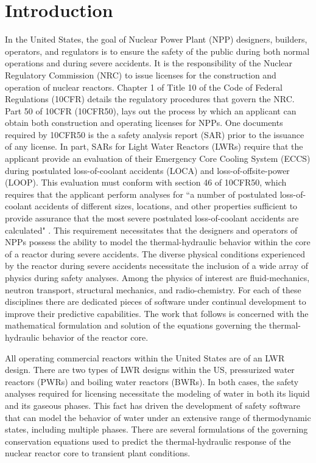\chapter{Introduction}
\label{chap:intro}
In the United States, the goal of Nuclear Power Plant (NPP) designers, builders, operators, and regulators is to ensure the safety of the public during both normal operations and during severe accidents.
It is the responsibility of the Nuclear Regulatory Commission (NRC) to issue licenses for the construction and operation of nuclear reactors.
Chapter 1 of Title 10 of the Code of Federal Regulations (10CFR) details the regulatory procedures that govern the NRC.
Part 50 of 10CFR (10CFR50), lays out the process by which an applicant can obtain both construction and operating licenses for NPPs.
One documents required by 10CFR50 is the a safety analysis report (SAR) prior to the issuance of any license.
In part, SARs for Light Water Reactors (LWRs) require that the applicant provide an evaluation of their Emergency Core Cooling System (ECCS) during postulated loss-of-coolant accidents (LOCA) and loss-of-offsite-power (LOOP).
This evaluation must conform with section 46 of 10CFR50, which requires that the applicant perform analyses for ``a number of postulated loss-of-coolant accidents of different sizes, locations, and other properties sufficient to provide assurance that the most severe postulated loss-of-coolant accidents are calculated" .
This requirement necessitates that the designers and operators of NPPs possess the ability to model the thermal-hydraulic behavior within the core of a reactor during severe accidents.  
The diverse physical conditions experienced by the reactor during severe accidents necessitate the inclusion of a wide array of physics during safety analyses.
Among the physics of interest are fluid-mechanics, neutron transport, structural mechanics, and radio-chemistry.
For each of these disciplines there are dedicated pieces of software under continual development to improve their predictive capabilities.
The work that follows is concerned with the mathematical formulation and solution of the equations governing the thermal-hydraulic behavior of the reactor core.

All operating commercial reactors within the United States are of an LWR design.
There are two types of LWR designs within the US, pressurized water reactors (PWRs) and boiling water reactors (BWRs).
In both cases, the safety analyses required for licensing necessitate the modeling of water in both its liquid and its gaseous phases.
This fact has driven the development of safety software that can model the behavior of water under an extensive range of thermodynamic states, including multiple phases.
There are several formulations of the governing conservation equations used to predict the thermal-hydraulic response of the nuclear reactor core to transient plant conditions.

